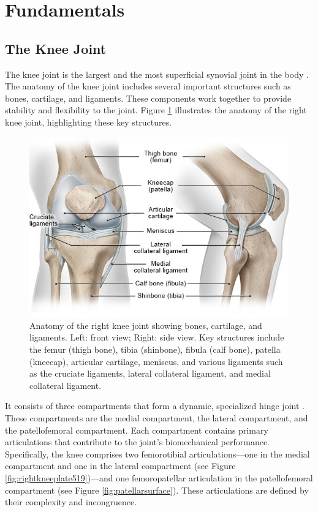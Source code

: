 \documentclass{micro-econ-thesis}
\begin{document}
\section{Fundamentals}
\label{sec:fundamentals}


\subsection{The Knee Joint }

The knee joint is the largest and the most superficial synovial joint in the body \parencite{dalley_moores_2023}. The anatomy of the knee joint includes several important structures such as bones, cartilage, and ligaments. These components work together to provide stability and flexibility to the joint. Figure \ref{fig:kniearthrosekniegelenk-anatomieenjpg} illustrates the anatomy of the right knee joint, highlighting these key structures.
\begin{figure}[H]
	\centering
	\includegraphics[width=0.7\linewidth]{kniearthrose_kniegelenk-anatomie_enjpg}
	\caption{Anatomy of the right knee joint showing bones, cartilage, and ligaments. Left: front view; Right: side view. Key structures include the femur (thigh bone), tibia (shinbone), fibula (calf bone), patella (kneecap), articular cartilage, meniscus, and various ligaments such as the cruciate ligaments, lateral collateral ligament, and medial collateral ligament. \parencite{informedhealth2021}}
	\label{fig:kniearthrosekniegelenk-anatomieenjpg}
\end{figure}

 
It consists of three compartments that form a dynamic, specialized hinge joint \parencite[p.1395]{standring_grays_2021}. These compartments are the medial compartment, the lateral compartment, and the patellofemoral compartment.
Each compartment contains primary articulations that contribute to the joint's biomechanical performance. Specifically, the knee comprises two femorotibial articulations—one in the medial compartment and one in the lateral compartment (see Figure \ref{fig:rightkneeplate519})—and one femoropatellar articulation in the patellofemoral compartment (see Figure \ref{fig:patellarsurface}). These articulations are defined by their complexity and incongruence. 
 
\end{document}
